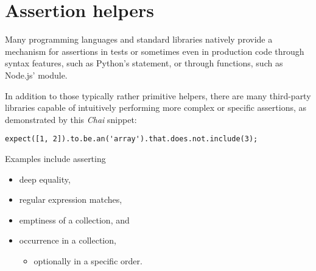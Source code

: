 \section{Assertion helpers}
Many programming languages and standard libraries
natively provide a mechanism for assertions
in tests or sometimes even in production code
through syntax features, such as Python's  statement,
\autocite[Chapter 7.3: The assert statement]{PythonLangRef}
or through functions, such as Node.js'  module.
\autocite[Chapter: Assert]{NodejsDoc}

In addition to those typically rather primitive helpers,
there are many third-party libraries capable of
intuitively performing more complex or specific assertions,
as demonstrated by this \textit{Chai} snippet:
\autocite[Chapter: API Reference --- Language Chains --- .not]{ChaiBddDoc}
\begin{verbatim}
expect([1, 2]).to.be.an('array').that.does.not.include(3);
\end{verbatim}
Examples include asserting
\autocite{ChaiBddDoc}\autocite{JavaHamcrestJavadoc}
\begin{itemize}
  \item deep equality,
  \item regular expression matches,
  \item emptiness of a collection, and
  \item occurrence in a collection,
    \begin{itemize}
      \item optionally in a specific order.
    \end{itemize}
\end{itemize}
